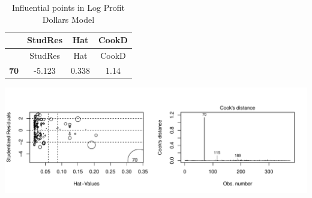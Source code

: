 \documentclass[]{elsarticle} %
\makeatletter
\def\maxwidth{\ifdim\Gin@nat@width>\linewidth\linewidth
\else\Gin@nat@width\fi}
\let\Oldincludegraphics\includegraphics
\renewcommand{\includegraphics}[1]{\Oldincludegraphics[width=\maxwidth]{#1}}
\makeatother
\begin{document}
\begin{longtable}[]{@{}cccc@{}}
\caption{Influential points in Log Profit Dollars Model}\tabularnewline
\toprule
\begin{minipage}[b]{0.11\columnwidth}\centering\strut
~\strut
\end{minipage} & \begin{minipage}[b]{0.12\columnwidth}\centering\strut
StudRes\strut
\end{minipage} & \begin{minipage}[b]{0.07\columnwidth}\centering\strut
Hat\strut
\end{minipage} & \begin{minipage}[b]{0.09\columnwidth}\centering\strut
CookD\strut
\end{minipage}\tabularnewline
\midrule
\endfirsthead
\toprule
\begin{minipage}[b]{0.11\columnwidth}\centering\strut
~\strut
\end{minipage} & \begin{minipage}[b]{0.12\columnwidth}\centering\strut
StudRes\strut
\end{minipage} & \begin{minipage}[b]{0.07\columnwidth}\centering\strut
Hat\strut
\end{minipage} & \begin{minipage}[b]{0.09\columnwidth}\centering\strut
CookD\strut
\end{minipage}\tabularnewline
\midrule
\endhead
\begin{minipage}[t]{0.11\columnwidth}\centering\strut
\textbf{70}\strut
\end{minipage} & \begin{minipage}[t]{0.12\columnwidth}\centering\strut
-5.123\strut
\end{minipage} & \begin{minipage}[t]{0.07\columnwidth}\centering\strut
0.338\strut
\end{minipage} & \begin{minipage}[t]{0.09\columnwidth}\centering\strut
1.14\strut
\end{minipage}\tabularnewline
\bottomrule
\end{longtable}

\includegraphics{Final_Project_files/figure-latex/unnamed-chunk-21-1.pdf}
\end{document}
